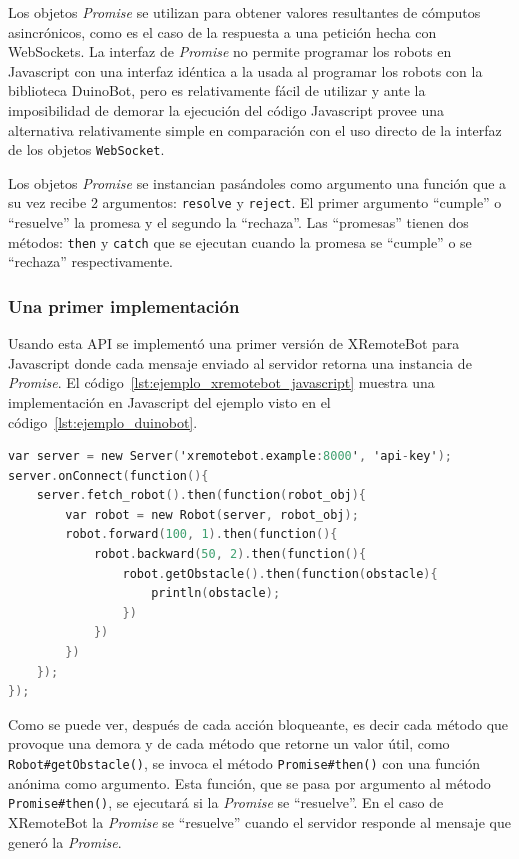 Los objetos \textit{Promise} se utilizan para obtener valores resultantes
de cómputos asincrónicos, como es el caso de la respuesta a una petición
hecha con WebSockets. La interfaz de \textit{Promise} no permite programar
los robots en Javascript con una interfaz idéntica a la usada al programar
los robots con la biblioteca DuinoBot, pero es relativamente fácil de
utilizar y ante la imposibilidad de demorar la ejecución del código
Javascript provee una alternativa
relativamente simple en comparación con el uso directo de la interfaz
de los objetos \texttt{WebSocket}.

Los objetos \textit{Promise} se instancian pasándoles como argumento una
función que a su vez recibe 2 argumentos: \texttt{resolve} y \texttt{reject}.
El primer argumento ``cumple'' o ``resuelve'' la promesa y el segundo la
``rechaza''.
Las ``promesas'' tienen dos métodos: \texttt{then} y \texttt{catch} que se
ejecutan cuando la promesa se ``cumple'' o se ``rechaza'' respectivamente.

\subsubsection{Una primer implementación}
Usando esta API se implementó una primer versión de XRemoteBot para Javascript
donde cada mensaje enviado al servidor retorna una instancia de \textit{Promise}.
El código~\ref{lst:ejemplo_xremotebot_javascript} muestra una implementación
en Javascript del ejemplo visto en el código~\ref{lst:ejemplo_duinobot}.

\begin{lstlisting}[language=C,
caption={Ejemplo de XRemoteBot en Javascript},
label=lst:ejemplo_xremotebot_javascript]
var server = new Server('xremotebot.example:8000', 'api-key');
server.onConnect(function(){
    server.fetch_robot().then(function(robot_obj){
        var robot = new Robot(server, robot_obj);
        robot.forward(100, 1).then(function(){
            robot.backward(50, 2).then(function(){
                robot.getObstacle().then(function(obstacle){
                    println(obstacle);
                })
            })
        })
    });
});
\end{lstlisting}

Como se puede ver, después de cada acción bloqueante, es decir cada método que
provoque una demora y de cada método que retorne un valor útil, como
\texttt{Robot\#getObstacle()}, se invoca el método \texttt{Promise\#then()} con
una función anónima como argumento. Esta función, que se pasa por argumento al
método \texttt{Promise\#then()}, se ejecutará si la \textit{Promise} se
``resuelve''. En el caso de
XRemoteBot la \textit{Promise} se ``resuelve'' cuando el servidor
responde al mensaje que generó la \textit{Promise}.


